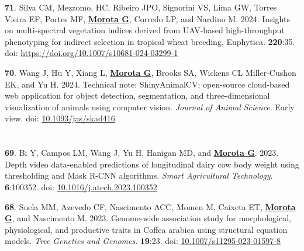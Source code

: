 \documentclass[margin,line,10pt]{res}
\newenvironment{list1}{
  \begin{list}{\ding{113}}{%
      \setlength{\itemsep}{0in}
      \setlength{\parsep}{0in} \setlength{\parskip}{0in}
      \setlength{\topsep}{0in} \setlength{\partopsep}{0in} 
      \setlength{\leftmargin}{0.17in}}}{\end{list}}
\begin{document}
\begin{resume}
\begin{list1}
  \vspace{0.5cm}

  \item  [{\bf 71}.]  Silva CM, Mezzomo, HC, Ribeiro JPO, Signorini VS, Lima GW, Torres Vieira EF, Portes MF, \textbf{\underline{Morota G}}, Corredo LP, and Nardino M. 2024. Insights on multi-spectral vegetation indices derived from UAV-based high-throughput phenotyping for indirect selection in tropical wheat breeding. Euphytica. \textbf{220}:35. doi: \textcolor{blue}{\href{https://doi.org/10.1007/s10681-024-03299-1}{https://doi.org/10.1007/s10681-024-03299-1}}

  \vspace{0.5cm}

  \item  [{\bf 70}.] Wang J, Hu Y, Xiang L, \textbf{\underline{Morota G}}, Brooks SA, Wickens CL Miller-Cushon EK, and Yu H. 2024. Technical note: ShinyAnimalCV: open-source cloud-based web application for object detection, segmentation, and three-dimensional visualization of animals using computer vision. \emph{Journal of Animal Science}. Early view. doi: \textcolor{blue}{\href{https://doi.org/10.1093/jas/skad416}{10.1093/jas/skad416}}


\end{list1}



\section{}
\begin{list1}


  \item  [{\bf 69}.]  Bi Y, Campos LM, Wang J, Yu H, Hanigan MD, and \textbf{\underline{Morota G}}. 2023. Depth video data-enabled predictions of longitudinal dairy cow body weight using thresholding and Mask R-CNN algorithms. \emph{Smart Agricultural Technology}. \textbf{6}:100352. doi: \textcolor{blue}{\href{https://doi.org/10.1016/j.atech.2023.100352}{10.1016/j.atech.2023.100352}}

  \vspace{0.5cm}

  \item  [{\bf 68}.] Suela MM, Azevedo CF, Nascimento ACC, Momen M, Caixeta ET, \textbf{\underline{Morota G}}, and Nascimento M. 2023. Genome-wide association study for morphological, physiological, and productive traits in Coffea arabica using structural equation models. \emph{Tree Genetics and Genomes}. \textbf{19}:23. doi: \textcolor{blue}{\href{https://doi.org/10.1007/s11295-023-01597-8}{10.1007/s11295-023-01597-8}} 


\end{list1}
\end{resume}
\end{document}
